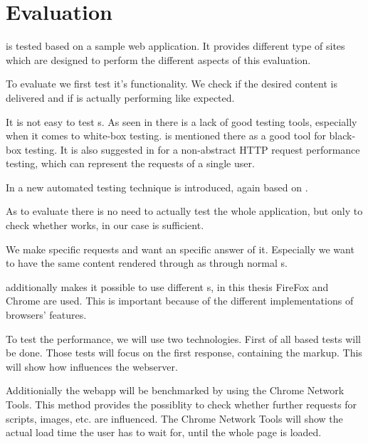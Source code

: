 \section{Evaluation}
\lare{} is tested based on a sample web application.
It provides different type of sites which are designed to perform the different aspects of this evaluation.


To evaluate \lare{} we first test it's functionality.
We check if the desired content is delivered and if \lare{} is actually performing like expected.

It is not easy to test \ajax{} \webApplication{}s.
As seen in \cite{bib:marchetto_tonella_ricca07} there is a lack of good testing tools, especially when it comes to white-box testing.
\selenium{} is mentioned there as a good tool for black-box testing.
It is also suggested in \cite{bib:palomaeki09} for a non-abstract HTTP request performance testing, which can represent the requests of a single user.

In \cite{bib:marchetto_tonella_ricca08} a new automated testing technique is introduced, again based on \selenium{}.

As to evaluate \lare{} there is no need to actually test the whole application, but only to check whether \lare{} works, \selenium{} in our case is sufficient.

We make specific requests and want an specific answer of it.
Especially we want to have the same content rendered through \lare{} as through normal \httpRequest{}s.

\selenium{} additionally makes it possible to use different \webdriver{}s, in this thesis FireFox and Chrome are used.
This is important because of the different implementations of browsers' features.

To test the performance, we will use two technologies.
\cite{bib:bozdag_mesbah_vanDeursen08}
First of all \curl{} based tests will be done.
Those tests will focus on the first response, containing the markup.
This will show how \lare{} influences the webserver.

Additionially the webapp will be benchmarked by using the Chrome Network Tools.
This method provides the possiblity to check whether further requests for scripts, images, etc. are influenced.
The Chrome Network Tools will show the actual load time the user has to wait for, until the whole page is loaded.

